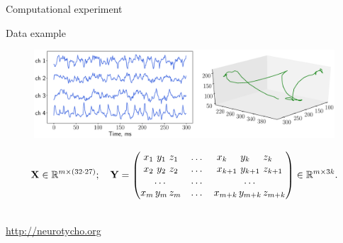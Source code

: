 \documentclass[9pt]{beamer}
\newcommand{\bY}{\mathbf{Y}}
\newcommand{\bX}{\mathbf{X}}
\newcommand{\bbR}{\mathbb{R}}
\begin{document}
\begin{frame}{Computational experiment}
\begin{block}{Data example}
	\begin{figure}
		\includegraphics[width=\linewidth]{figs/ecog_data}
	\end{figure}
\end{block}

\[
	\bX \in \bbR^{m \times (32 \cdot 27)}; \quad 
	\bY = 
	\begin{pmatrix}
	x_1 \,\, y_1 \,\, z_1 & \dots & x_{k\hphantom{+1}} \,\, y_{k\hphantom{+1}} \,\, z_{k\hphantom{+1}}\\
	x_2 \,\, y_2 \,\, z_2 & \dots & x_{k + 1} \,\, y_{k + 1} \,\, z_{k + 1}\\
	 \dots & \dots & \dots  \\
	x_m \, y_m \, z_m & \dots & x_{m + k} \, y_{m + k} \, z_{m + k}
	\end{pmatrix} \in \bbR^{m \times 3k}.
\]
\vspace{0.5cm}

\hrulefill \\
\url{http://neurotycho.org}
\end{frame}
\end{document}
